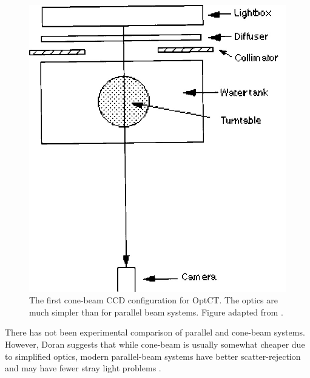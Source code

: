 \begin{figure}[H]
\centering
\includegraphics[scale=0.3]{Wolodzko_1999_conesetup.jpg}
\caption{The first cone-beam CCD configuration for OptCT. The optics are much simpler than for parallel beam systems. Figure adapted from \cite{Wolodzko:1999}.}
\end{figure}


There has not been experimental comparison of parallel and cone-beam systems. However,  Doran suggests that while cone-beam is usually somewhat cheaper due to simplified optics, modern parallel-beam systems have better scatter-rejection and may have fewer stray light problems \cite{Doran:2008kh, Olding:2011eta, Thomas:2011eja}.



 

 





